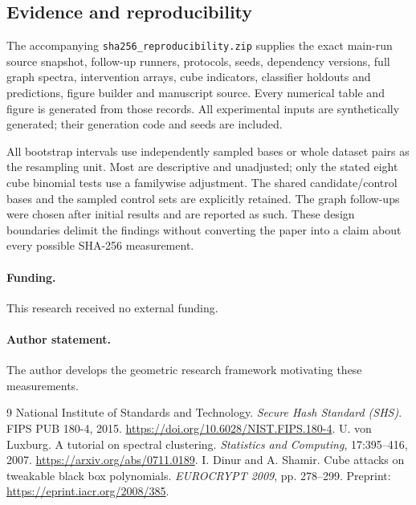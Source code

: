 \documentclass[11pt]{article}
\begin{document}
\subsection{Evidence and reproducibility}

The accompanying \texttt{sha256\_reproducibility.zip} supplies the exact main-run source snapshot, follow-up runners, protocols, seeds, dependency versions, full graph spectra, intervention arrays, cube indicators, classifier holdouts and predictions, figure builder and manuscript source. Every numerical table and figure is generated from those records. All experimental inputs are synthetically generated; their generation code and seeds are included.

All bootstrap intervals use independently sampled bases or whole dataset pairs as the resampling unit. Most are descriptive and unadjusted; only the stated eight cube binomial tests use a familywise adjustment. The shared candidate/control bases and the sampled control sets are explicitly retained. The graph follow-ups were chosen after initial results and are reported as such. These design boundaries delimit the findings without converting the paper into a claim about every possible SHA-256 measurement.

\paragraph{Funding.} This research received no external funding.
\paragraph{Author statement.} The author develops the geometric research framework motivating these measurements.

\begin{thebibliography}{9}
 National Institute of Standards and Technology. \emph{Secure Hash Standard (SHS)}. FIPS PUB 180-4, 2015. \url{https://doi.org/10.6028/NIST.FIPS.180-4}.
 U. von Luxburg. A tutorial on spectral clustering. \emph{Statistics and Computing}, 17:395--416, 2007. \url{https://arxiv.org/abs/0711.0189}.
 I. Dinur and A. Shamir. Cube attacks on tweakable black box polynomials. \emph{EUROCRYPT 2009}, pp. 278--299. Preprint: \url{https://eprint.iacr.org/2008/385}.
\end{thebibliography}
\end{document}
